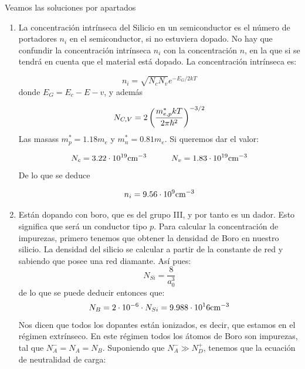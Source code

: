 	Veamos las soluciones por apartados
	\begin{enumerate}[label=\alph*)]
		\item La concentración intrínseca del Silicio en un semiconductor es el número de portadores $n_i$ en el semiconductor, si no estuviera dopado. No hay que confundir la concentración intrínseca $n_i$ con la concentración $n$, en la que si se tendrá en cuenta que el material está dopado. La concentración intrínseca es:

		      \begin{equation}
			      n_i = \sqrt{N_cN_v} e^{-E_G/2kT}
		      \end{equation}
		      donde $E_G=E_c-E-v$, y además

		      \begin{equation}
			      N_{C,V} = 2 \left( \frac{m_{e,p}^* kT}{2\pi\hbar^2} \right)^{-3/2}
		      \end{equation}
		      Las masass $m_p^*= 1.18m_e$ y $m_n^*=0.81m_e$. Si queremos dar el valor:

		      \begin{equation}
			      N_c = 3.22 \cdot 10^{19} \text{cm}^{-3} \quad \quad \quad 	N_v = 1.83 \cdot 10^{19} \text{cm}^{-3}
		      \end{equation}
		      De lo que se deduce

		      \begin{equation}
			      n_i = 9.56 \cdot 10^9 \text{cm}^{-3}
		      \end{equation}


		\item Están dopando con boro, que es del grupo III, y por tanto es un dador. Esto significa que será un conductor tipo $p$. Para calcular la concentración de impurezas, primero tenemos que obtener la densidad de Boro en nuestro silicio. La densidad del silicio se calcular a partir de la constante de red y sabiendo que posee una red diamante. Así pues:
		      \begin{equation}
			      N_{Si} = \frac{8}{a_0^3}
		      \end{equation}
		      de lo que se puede deducir entonces que:
		      \begin{equation}
			      N_B = 2\cdot 10^{-6} \cdot N_{Si} = 9.988 \cdot 10^16 \text{cm}^{-3}
		      \end{equation}
		      Nos dicen que todos los dopantes están ionizados, es decir, que estamos en el régimen extrínseco. En este régimen todos los átomos de Boro son impurezas, tal que $N_A^-=N_A=N_B$. Suponiendo que $N_A^- \gg N_D^+$, tenemos que la ecuación de neutralidad de carga:


\end{enumerate}
